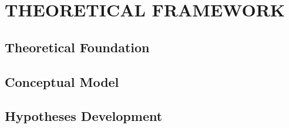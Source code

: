 
\chapter{THEORETICAL FRAMEWORK}\label{chap:theoretical_framework}


\section{Theoretical Foundation}\label{sec:theory}

\section{Conceptual Model}\label{sec:model}

\section{Hypotheses Development}\label{sec:hypotheses}
